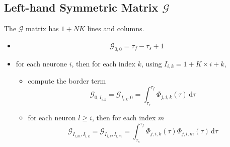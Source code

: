 \documentclass{revtex4}
\begin{document}
\subsection{Left-hand Symmetric Matrix $\mathcal{G}$}
The $\mathcal{G}$ matrix has $1+NK$ lines and columns.
\begin{itemize}
	\item 
		$$ 
		\mathcal{G}_{0,0} = \tau_f-\tau_s+1
		$$
	\item for each neurone $i$, then for each index $k$, using $I_{i,k}=1+K\times i + k$,
		\begin{itemize}
		\item compute the border term
		$$
			\mathcal{G}_{0,I_{i,k}} = \mathcal{G}_{I_{i,k},0} = \int_{\tau_s}^{\tau_f} \Phi_{j,i,k}(\tau) \, \mathrm{d}\tau
		$$
		\item for each neuron $l\geq i$, then for each index $m$
		$$
			\mathcal{G}_{I_{l,m},I_{i,k}} = \mathcal{G}_{I_{i,k},I_{l,m}}  =
			\int_{\tau_s}^{\tau_f}  \Phi_{j,i,k}(\tau) \Phi_{j,l,m}(\tau) \, \mathrm{d}\tau
		$$
		\end{itemize}
	
\end{itemize}
\end{document}
